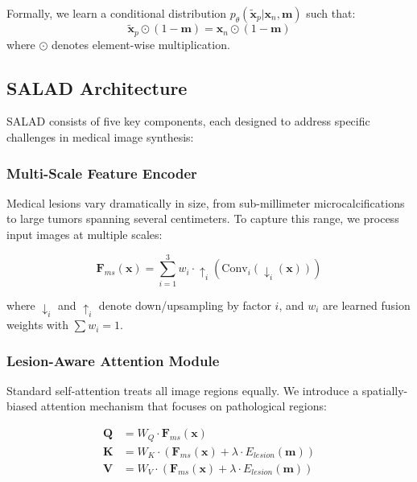 \documentclass[10pt,twocolumn]{article}
\begin{document}
Formally, we learn a conditional distribution $p_\theta(\tilde{\mathbf{x}}_p | \mathbf{x}_n, \mathbf{m})$ such that:
\begin{equation}
\tilde{\mathbf{x}}_p \odot (1-\mathbf{m}) = \mathbf{x}_n \odot (1-\mathbf{m})
\end{equation}
where $\odot$ denotes element-wise multiplication.

\subsection{SALAD Architecture}

SALAD consists of five key components, each designed to address specific challenges in medical image synthesis:

\subsubsection{Multi-Scale Feature Encoder}

Medical lesions vary dramatically in size, from sub-millimeter microcalcifications to large tumors spanning several centimeters. To capture this range, we process input images at multiple scales:

\begin{equation}
\mathbf{F}_{ms}(\mathbf{x}) = \sum_{i=1}^{3} w_i \cdot \uparrow_i(\text{Conv}_i(\downarrow_i(\mathbf{x})))
\end{equation}

where $\downarrow_i$ and $\uparrow_i$ denote down/upsampling by factor $i$, and $w_i$ are learned fusion weights with $\sum w_i = 1$.

\subsubsection{Lesion-Aware Attention Module}

Standard self-attention treats all image regions equally. We introduce a spatially-biased attention mechanism that focuses on pathological regions:

\begin{align}
\mathbf{Q} &= W_Q \cdot \mathbf{F}_{ms}(\mathbf{x}) \\
\mathbf{K} &= W_K \cdot (\mathbf{F}_{ms}(\mathbf{x}) + \lambda \cdot E_{lesion}(\mathbf{m})) \\
\mathbf{V} &= W_V \cdot (\mathbf{F}_{ms}(\mathbf{x}) + \lambda \cdot E_{lesion}(\mathbf{m}))
\end{align}
\end{document}
